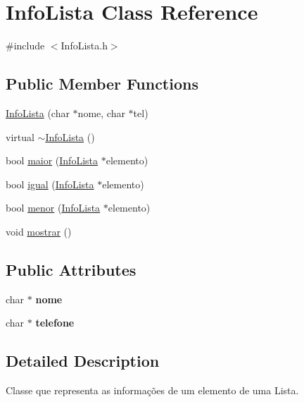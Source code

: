 \hypertarget{classInfoLista}{
\section{InfoLista Class Reference}
\label{classInfoLista}
}


{\ttfamily \#include $<$InfoLista.h$>$}

\subsection*{Public Member Functions}
\begin{DoxyCompactItemize}
\item 
\hyperlink{classInfoLista_a871f01546b40a897dc288429b5eea074}{InfoLista} (char $\ast$nome, char $\ast$tel)
\item 
virtual \hyperlink{classInfoLista_aeea4b3c1ae53da265e498491836194af}{$\sim$InfoLista} ()
\item 
bool \hyperlink{classInfoLista_a01e2da9f49b956050bd1ed8013f50ebb}{maior} (\hyperlink{classInfoLista}{InfoLista} $\ast$elemento)
\item 
bool \hyperlink{classInfoLista_a70506fe7f409bf4b263d44a1ef70d511}{igual} (\hyperlink{classInfoLista}{InfoLista} $\ast$elemento)
\item 
bool \hyperlink{classInfoLista_a6ff726d635246d316a477a9fad40f2d5}{menor} (\hyperlink{classInfoLista}{InfoLista} $\ast$elemento)
\item 
void \hyperlink{classInfoLista_a818f2420b2b316d18e11ba435eb705d7}{mostrar} ()
\end{DoxyCompactItemize}
\subsection*{Public Attributes}
\begin{DoxyCompactItemize}
\item 
\hypertarget{classInfoLista_a6ce8f8cff5e131de2458772f8f3b2502}{
char $\ast$ {\bfseries nome}}
\label{classInfoLista_a6ce8f8cff5e131de2458772f8f3b2502}

\item 
\hypertarget{classInfoLista_a9ba6cfcb036102a3c3e996ff2f1e6169}{
char $\ast$ {\bfseries telefone}}
\label{classInfoLista_a9ba6cfcb036102a3c3e996ff2f1e6169}

\end{DoxyCompactItemize}


\subsection{Detailed Description}
Classe que representa as informações de um elemento de uma Lista. 

